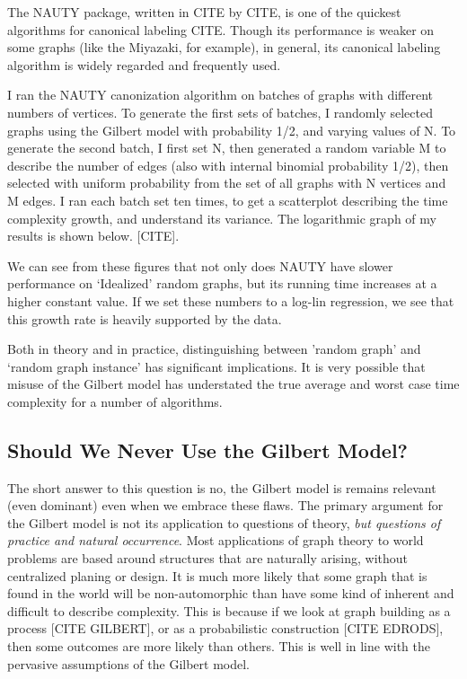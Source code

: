 The NAUTY package, written in CITE by CITE, is one of the quickest algorithms for canonical labeling CITE.
Though its performance is weaker on some graphs (like the Miyazaki, for example), in general, its canonical labeling algorithm is widely regarded and frequently used.

I ran the NAUTY canonization algorithm on batches of graphs with different numbers of vertices.
To generate the first sets of batches, I randomly selected graphs using the Gilbert model with probability 1/2, and varying values of N.
To generate the second batch, I first set N, then generated a random variable M to describe the number of edges (also with internal binomial probability 1/2), then selected with uniform probability from the set of all graphs with N vertices and M edges.
I ran each batch set ten times, to get a scatterplot describing the time complexity growth, and understand its variance.
The logarithmic graph of my results is shown below.  [CITE].

We can see from these figures that not only does NAUTY have slower performance on `Idealized' random graphs, but its running time increases at a higher constant value.
If we set these numbers to a log-lin regression, we see that this growth rate is heavily supported by the data.

Both in theory and in practice, distinguishing between 'random graph' and `random graph instance' has significant implications.
It is very possible that misuse of the Gilbert model has understated the true average and worst case time complexity for a number of algorithms.

\subsection{Should We Never Use the Gilbert Model?}

The short answer to this question is no, the Gilbert model is remains relevant (even dominant) even when we embrace these flaws.
The primary argument for the Gilbert model is not its application to questions of theory, \emph{but questions of practice and natural occurrence}.
Most applications of graph theory to world problems are based around structures that are naturally arising, without centralized planing or design.
It is much more likely that some graph that is found in the world will be non-automorphic than have some kind of inherent and difficult to describe complexity.
This is because if we look at graph building as a process [CITE GILBERT], or as a probabilistic construction [CITE EDRODS], then some outcomes are more likely than others.
This is well in line with the pervasive assumptions of the Gilbert model.

